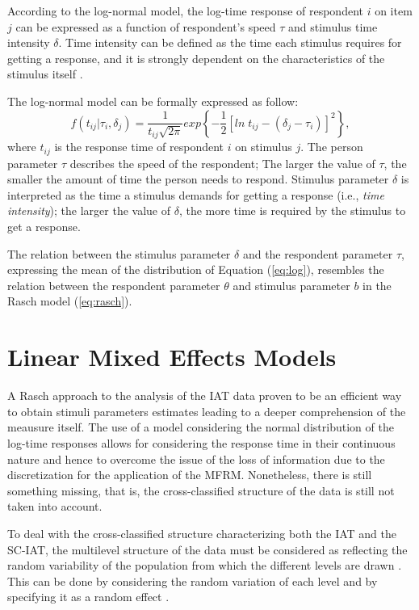 \documentclass[12pt]{book}
\begin{document}
According to the log-normal model, the log-time response of respondent $i$ on item $j$ can be expressed as a function of respondent's speed $\tau$ and stimulus time intensity $\delta$. Time intensity can be defined as the time each stimulus requires for getting a response, and it is strongly dependent on the characteristics of the stimulus itself \cite{van2006}. 

The log-normal model can be formally expressed as follow: 
%
\begin{equation}\label{eq:log}
f(t_{ij}| \tau_i, \delta_j) = \frac{1}{t_{ij}\sqrt{2\pi}}exp\left\{ -\frac{1}{2}[ln\;t_{ij} - (\delta_j - \tau_i)]^2 \right\},
\end{equation} 
%
where $t_{ij}$ is the response time of respondent $i$ on stimulus $j$. The person parameter $\tau$ describes the speed of the respondent; The larger the value of $\tau$, the smaller the amount of time the person needs to respond. Stimulus parameter $\delta$ is interpreted as the time a stimulus demands for getting a response (i.e., \emph{time intensity}); the larger the value of $\delta$, the more time is required by the stimulus to get a response. 

The relation between the stimulus parameter $\delta$ and the respondent parameter $\tau$, expressing the mean of the distribution of Equation (\ref{eq:log}), resembles the relation between the respondent parameter $\theta$ and stimulus parameter $b$ in the Rasch model (\ref{eq:rasch}).

\section{Linear Mixed Effects Models}

A Rasch approach to the analysis of the IAT data proven to be an efficient way to obtain stimuli parameters estimates leading to a deeper comprehension of the meausure itself. The use of a model considering the normal distribution of the log-time responses allows for considering the response time in their continuous nature and hence to overcome the issue of the loss of information due to the discretization for the application of the MFRM. Nonetheless, there is still something missing, that is, the cross-classified structure of the data is still not taken into account. 

To deal with the cross-classified structure characterizing both the IAT and the SC-IAT, the multilevel structure of the data must be considered as reflecting the random variability of the population from which the different levels are drawn \cite{Barr2013}. This can be done by considering the random variation of each level and by specifying it as a random effect \cite{Doran2007}. 
\end{document}
